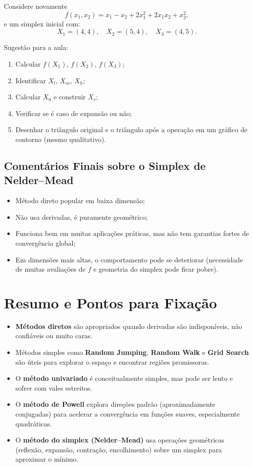 \documentclass[9pt,a4paper]{extarticle}
\begin{document}
Considere novamente
\[
    f(x_1,x_2) = x_1 - x_2 + 2x_1^2 + 2x_1x_2 + x_2^2,
\]
e um simplex inicial com:
\[
    X_1 = (4,4),\quad
    X_2 = (5,4),\quad
    X_3 = (4,5).
\]

Sugestão para a aula:
\begin{enumerate}
    \item Calcular $f(X_1)$, $f(X_2)$, $f(X_3)$;
    \item Identificar $X_l$, $X_m$, $X_h$;
    \item Calcular $X_0$ e construir $X_r$;
    \item Verificar se é caso de expansão ou não;
    \item Desenhar o triângulo original e o triângulo após a operação em um gráfico de contorno (mesmo qualitativo).
\end{enumerate}

\subsection{Comentários Finais sobre o Simplex de Nelder--Mead}

\begin{itemize}
    \item Método direto popular em baixa dimensão;
    \item Não usa derivadas, é puramente geométrico;
    \item Funciona bem em muitas aplicações práticas, mas não tem garantias fortes de convergência global;
    \item Em dimensões mais altas, o comportamento pode se deteriorar (necessidade de muitas avaliações de $f$ e geometria do simplex pode ficar pobre).
\end{itemize}

\section*{Resumo e Pontos para Fixação}

\begin{itemize}
    \item \textbf{Métodos diretos} são apropriados quando derivadas são indisponíveis, não confiáveis ou muito caras.
    \item Métodos simples como \textbf{Random Jumping}, \textbf{Random Walk} e \textbf{Grid Search} são úteis para explorar o espaço e encontrar regiões promissoras.
    \item O \textbf{método univariado} é conceitualmente simples, mas pode ser lento e sofrer com vales estreitos.
    \item O \textbf{método de Powell} explora direções padrão (aproximadamente conjugadas) para acelerar a convergência em funções suaves, especialmente quadráticas.
    \item O \textbf{método do simplex (Nelder--Mead)} usa operações geométricas (reflexão, expansão, contração, encolhimento) sobre um simplex para aproximar o mínimo.
\end{itemize}
\end{document}

